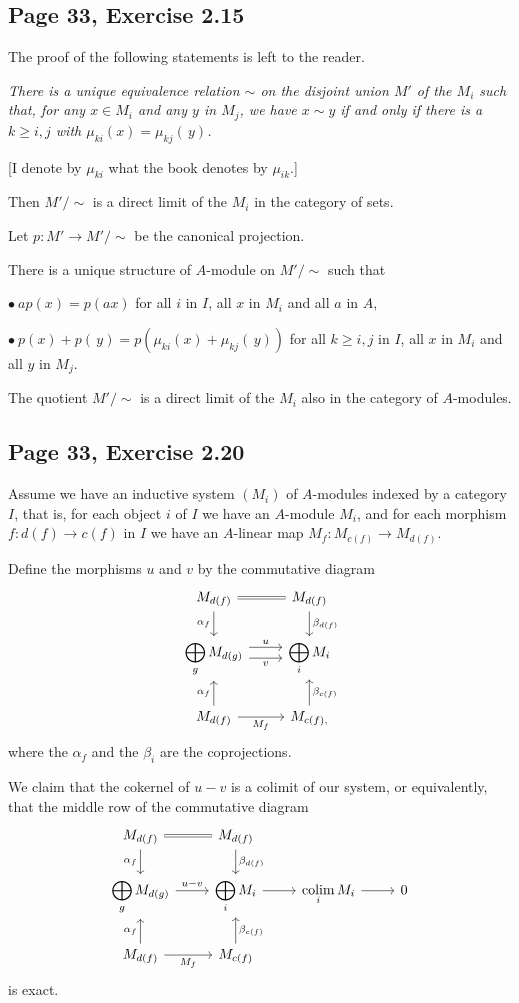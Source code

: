 \documentclass[parskip=half,fontsize=12pt]{scrartcl}%
\newcommand{\ds}{\displaystyle}
\begin{document}
\subsection{Page 33, Exercise 2.15}%

The proof of the following statements is left to the reader.

\emph{There is a unique equivalence relation $\sim$ on the disjoint union $M'$ of the $M_i$ such that, for any $x\in M_i$ and any $y$ in $M_j$, we have $x\sim y$ if and only if there is a $k\ge i,j$ with $\mu_{ki}(x)=\mu_{kj}(\,y)$.}

[I denote by $\mu_{ki}$ what the book denotes by $\mu_{ik}$.]

Then $M'/\sim$ is a direct limit of the $M_i$ in the category of sets. 

Let $p:M'\to M'/\sim$ be the canonical projection. 

There is a unique structure of $A$-module on $M'/\sim$ such that 

$\bullet\ ap(x)=p(ax)$ for all $i$ in $I$, all $x$ in $M_i$ and all $a$ in $A$, 

$\bullet\ p(x)+p(\,y)=p(\mu_{ki}(x)+\mu_{kj}(\,y))$ for all $k\ge i,j$ in $I$, all $x$ in $M_i$ and all $y$ in $M_j$. 

The quotient $M'/\sim$ is a direct limit of the $M_i$ also in the category of $A$-modules.

\subsection{Page 33, Exercise 2.20}%

Assume we have an inductive system $(M_i)$ of $A$-modules indexed by a category  $I$, that is, for each object $i$ of $I$ we have an $A$-module $M_i$, and for each morphism $f:d(f)\to c(f)$ in $I$ we have an $A$-linear map $M_f:M_{c(f)}\to M_{d(f)}$. 

Define the morphisms $u$ and $v$ by the commutative diagram
$$
\begin{tikzcd}
M_{d(f)}\ar[d,"\alpha_{f}"']\ar[r,equal]&M_{d(f)}\ar[d,"\beta_{d(f)}"]\\ 
\ds\bigoplus_gM_{d(g)}\ar[r,yshift=0.9ex,"u"]\ar[r,yshift=-0.9ex,"v"']&\ds\bigoplus_iM_i\\ 
M_{d(f)}\ar[u,"\alpha_{f}"]\ar[r,"M_f"']&M_{c(f),}\ar[u,"\beta_{c(f)}"']
\end{tikzcd}
$$ 
where the $\alpha_f$ and the $\beta_i$ are the coprojections. 

We claim that the cokernel of $u-v$ is a colimit of our system, or equivalently, that the middle row of the commutative diagram 
$$
\begin{tikzcd}
M_{d(f)}\ar[d,"\alpha_{f}"']\ar[r,equal]&M_{d(f)}\ar[d,"\beta_{d(f)}"]\\ 
\ds\bigoplus_gM_{d(g)}\ar[r,"u-v"]&\ds\bigoplus_iM_i\ar[r]&\ds\ooo{colim}_iM_i\ar[r]&0\\ 
M_{d(f)}\ar[u,"\alpha_{f}"]\ar[r,"M_f"']&M_{c(f)}\ar[u,"\beta_{c(f)}"']
\end{tikzcd}
$$ 
is exact. 
\end{document}
